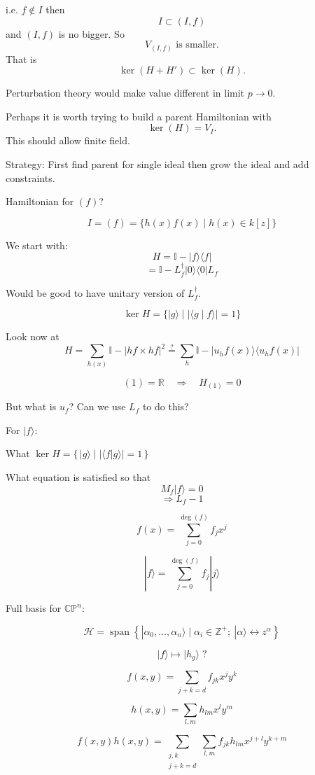 i.e. $f\notin I$ then
\[
I\subset (I,f)
\]
and $(I,f)$ is no bigger. So
\[
V_{(I,f)}\text{ is smaller.}
\]
That is
\[
\ker(H+H')\subset \ker(H).
\]

Perturbation theory would make value different in limit $p\to0$.

Perhaps it is worth trying to build a parent Hamiltonian with
\[
\ker(H)=V_I.
\]
This should allow finite field.

Strategy: First find parent for single ideal then grow the ideal and add constraints.

Hamiltonian for $(f)$?

\[
I=(f)=\{h(x)f(x)\mid h(x)\in k[z]\}
\]

We start with:
\[
H=\mathbb I-\lvert f\rangle\langle f\rvert
\]
\[
=\mathbb I-L_f^\dagger\lvert0\rangle\langle0\rvert L_f
\]

Would be good to have unitary version of $L_f^\dagger$.

\[
\ker H=\{\lvert g\rangle\mid \lvert\langle g\mid f\rangle\rvert=1\}
\]

Look now at
\[
H=\sum_{h(x)}\mathbb I-\lvert hf\times hf\rvert^2
\mathrel{\overset{?}{=}}
\sum_h\mathbb I-\lvert u_hf(x)\rangle\langle u_hf(x)\rvert
\]

\[
(1)=\mathbb R\quad\Longrightarrow\quad H_{(1)}=0
\]

But what is $u_f$? Can we use $L_f$ to do this?

For $|f\rangle$:

What $\ker H=\{\,|g\rangle\mid |\langle f|g\rangle|=1\,\}$

What equation is satisfied so that
\[
M_f|f\rangle=0
\]
\[
\Rightarrow L_f-1
\]

\[
f(x)=\sum_{j=0}^{\deg(f)} f_jx^j
\]

\[
|f\rangle=\sum_{j=0}^{\deg(f)} f_j|j\rangle
\]

Full basis for $\mathbb{CP}^n$:

\[
\mathcal{H}=\operatorname{span}\left\{|\alpha_0,\ldots,\alpha_n\rangle\mid \alpha_i\in\mathbb{Z}^+;\ |\alpha\rangle\leftrightarrow z^\alpha\right\}
\]

\[
|f\rangle\longmapsto |h_g\rangle\;?
\]

\[
f(x,y)=\sum_{j+k=d}f_{jk}x^jy^k
\]

\[
h(x,y)=\sum_{l,m}h_{lm}x^ly^m
\]

\[
f(x,y)h(x,y)=\sum_{\substack{j,k\\j+k=d}}\sum_{l,m}f_{jk}h_{lm}x^{j+l}y^{k+m}
\]

